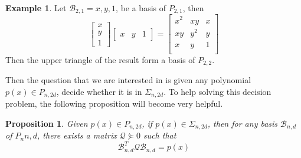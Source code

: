\documentclass[12pt]{amsart}
\numberwithin{equation}{section}
\newtheorem{prop}[thm]{Proposition}
\theoremstyle{definition}
\newtheorem{example}[thm]{Example}
\numberwithin{thm}{section}
\begin{document}
\begin{example}
     Let $\mathcal{B}_{2, 1} = {x, y, 1}$, be a basis of $P_{2, 1}$, then 
     \begin{equation}
          \begin{bmatrix}
               x \\
               y \\
               1
          \end{bmatrix}
          \begin{bmatrix}
               x & y & 1
          \end{bmatrix}
          = \begin{bmatrix}
               x^2 & xy & x \\
               xy & y^2 & y \\
               x & y & 1 \\
          \end{bmatrix}
     \end{equation}
     Then the upper triangle of the result form a basis of $P_{2, 2}$.
\end{example}

\smallskip
Then the question that we are interested in is given any polynomial $p(x) \in P_{n,2d}$, decide whether it is in $\Sigma_{n, 2d}$. 
To help solving this decision problem, the following proposition will become very helpful.

\begin{prop}
     Given $p(x) \in P_{n, 2d}$, if $p(x) \in \Sigma_{n, 2d}$, then for any basis $\mathcal{B}_{n, d}$ of $P_n{n, d}$, there exists a matrix $ \mathcal{Q} \curlyeqsucc 0$ such that
     \begin{equation}
          \mathcal{B}_{n, d} ^ T \mathcal{Q} \mathcal{B}_{n, d} = p(x)
     \end{equation}
\end{prop}
\end{document}
